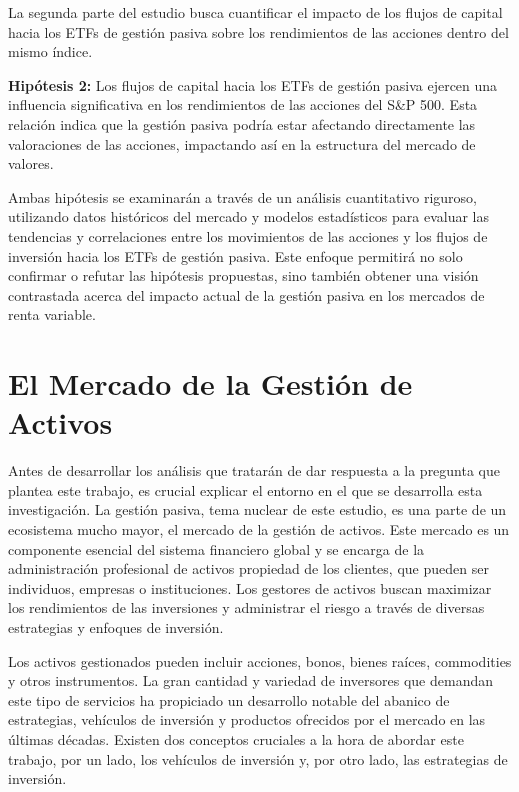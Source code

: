 \documentclass[12pt,a4paper]{article}
\begin{document}
La segunda parte del estudio busca cuantificar el impacto de los flujos de capital hacia los ETFs de gestión pasiva sobre los rendimientos de las acciones dentro del mismo índice.

\textbf{Hipótesis 2:} Los flujos de capital hacia los ETFs de gestión pasiva ejercen una influencia significativa en los rendimientos de las acciones del S\&P 500. Esta relación indica que la gestión pasiva podría estar afectando directamente las valoraciones de las acciones, impactando así en la estructura del mercado de valores.

Ambas hipótesis se examinarán a través de un análisis cuantitativo riguroso, utilizando datos históricos del mercado y modelos estadísticos para evaluar las tendencias y correlaciones entre los movimientos de las acciones y los flujos de inversión hacia los ETFs de gestión pasiva. Este enfoque permitirá no solo confirmar o refutar las hipótesis propuestas, sino también obtener una visión contrastada acerca del impacto actual de la gestión pasiva en los mercados de renta variable.

\newpage

\section{El Mercado de la Gestión de Activos}

Antes de desarrollar los análisis que tratarán de dar respuesta a la pregunta que plantea este trabajo, es crucial explicar el entorno en el que se desarrolla esta investigación. La gestión pasiva, tema nuclear de este estudio, es una parte de un ecosistema mucho mayor, el mercado de la gestión de activos. Este mercado es un componente esencial del sistema financiero global y se encarga de la administración profesional de activos propiedad de los clientes, que pueden ser individuos, empresas o instituciones. Los gestores de activos buscan maximizar los rendimientos de las inversiones y administrar el riesgo a través de diversas estrategias y enfoques de inversión.

Los activos gestionados pueden incluir acciones, bonos, bienes raíces, commodities y otros instrumentos. La gran cantidad y variedad de inversores que demandan este tipo de servicios ha propiciado un desarrollo notable del abanico de estrategias, vehículos de inversión y productos ofrecidos por el mercado en las últimas décadas. Existen dos conceptos cruciales a la hora de abordar este trabajo, por un lado, los vehículos de inversión y, por otro lado, las estrategias de inversión.
\end{document}
